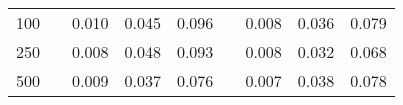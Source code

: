 % 
\begin{tabular}{ccccccccc}
  \hline
  \hline
100 &  & 0.010 & 0.045 & 0.096 &  & 0.008 & 0.036 & 0.079 \\ 
  250 &  & 0.008 & 0.048 & 0.093 &  & 0.008 & 0.032 & 0.068 \\ 
  500 &  & 0.009 & 0.037 & 0.076 &  & 0.007 & 0.038 & 0.078 \\ 
   \hline
\end{tabular}
